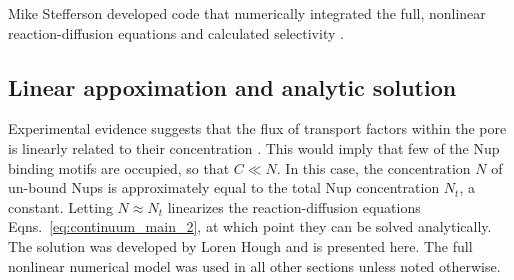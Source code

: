 Mike Stefferson developed code that numerically integrated the full, nonlinear reaction-diffusion equations and calculated selectivity \cite{stefferson18}.

\subsection{Linear appoximation and analytic solution}
\label{sec:linear}
Experimental evidence suggests that the flux of transport factors within the pore is linearly related to their concentration \cite{timney06, schmidt15}.  This would imply that few of the Nup binding motifs are occupied, so that $C \ll N$.  In this case, the concentration $N$ of un-bound Nups is approximately equal to the total Nup concentration $N_t$, a constant.  Letting $N \approx N_t$ linearizes the reaction-diffusion equations Eqns.~\ref{eq:continuum_main_2}, at which point they can be solved analytically.  The solution was developed by Loren Hough and is presented here.  The full nonlinear numerical model was used in all other sections unless noted otherwise.


